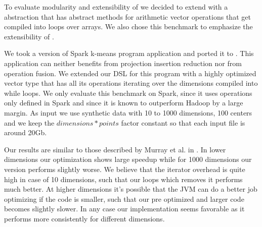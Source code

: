 To evaluate modularity and extensibility of \tool we decided to extend with a  abstraction that has abstract methods for arithmetic vector operations that get compiled into loops over arrays. We also chose this benchmark to emphasize the extensibility of \tool.

We took a version of Spark k-means program \cite{spark-nsdi} application and ported it to \tool. This application can neither benefits from projection insertion reduction nor from operation fusion. We extended our DSL for this program with a highly optimized vector type that has all its operations iterating over the dimensions compiled into while loops. We only evaluate this benchmark on Spark, since it uses operations only defined in Spark and since it is known to outperform Hadoop by a large margin. As input we use synthetic data with 10 to 1000 dimensions, 100 centers and we keep the $dimensions * points$ factor constant so that each input file is around 20Gb.

Our results are similar to those described by Murray et al. in \cite{murray_steno:_2011}. In lower dimensions our optimization shows large speedup while for 1000 dimensions our version performs slightly worse. We believe that the iterator overhead is quite high in case of 10 dimensions, such that our loops which removes it performs much better. At higher dimensions it's possible that the JVM can do a better job optimizing if the code is smaller, such that our pre optimized and larger code becomes slightly slower. In any case our implementation seems favorable as it performs more consistently for different dimensions.

